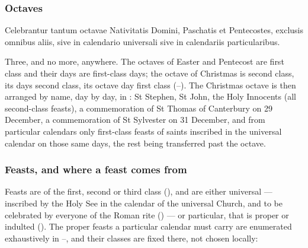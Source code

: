 \subsubsection*{Octaves}

\begin{rulebox}{}
Celebrantur tantum octavae Nativitatis Domini, Paschatis et Pentecostes,
exclusis omnibus aliis, sive in calendario universali sive in calendariis
particularibus.
\end{rulebox}

\noindent
Three, and no more, anywhere. The octaves of Easter and Pentecost are first
class and their days are first-class days; the octave of Christmas is second
class, its days second class, its octave day first class (--).
The Christmas octave is then arranged by name, day by day, in : St
Stephen, St John, the Holy Innocents (all second-class feasts), a
commemoration of St Thomas of Canterbury on 29 December, a commemoration of St
Sylvester on 31 December, and from particular calendars only first-class
feasts of saints inscribed in the universal calendar on those same days, the
rest being transferred past the octave.

\subsubsection*{Feasts, and where a feast comes from}

Feasts are of the first, second or third class (), and are either
universal --- inscribed by the Holy See in the calendar of the universal
Church, and to be celebrated by everyone of the Roman rite () --- or
particular, that is proper or indulted (). The proper feasts a
particular calendar must carry are enumerated exhaustively in
--, and their classes are fixed there, not chosen locally:

